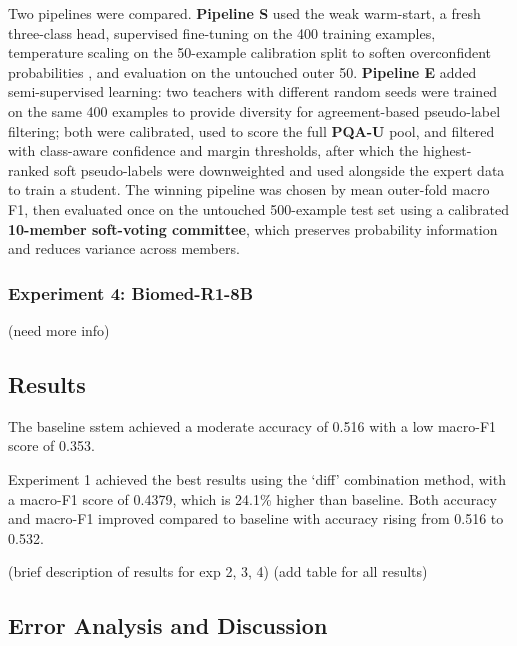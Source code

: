 \documentclass[11pt]{article}
\begin{document}
Two pipelines were compared. \textbf{Pipeline S} used the weak warm-start, a fresh three-class head, supervised fine-tuning on the 400 training examples, temperature scaling on the 50-example calibration split to soften overconfident probabilities \citep{guo_calibration_2017}, and evaluation on the untouched outer 50. \textbf{Pipeline E} added semi-supervised learning: two teachers with different random seeds were trained on the same 400 examples to provide diversity for agreement-based pseudo-label filtering; both were calibrated, used to score the full \textbf{PQA-U} pool, and filtered with class-aware confidence and margin thresholds, after which the highest-ranked soft pseudo-labels were downweighted and used alongside the expert data to train a student. The winning pipeline was chosen by mean outer-fold macro F1, then evaluated once on the untouched 500-example test set using a calibrated \textbf{10-member soft-voting committee}, which preserves probability information and reduces variance across members.

\subsubsection{Experiment 4: Biomed-R1-8B}
(need more info)

\subsection{Results}
The baseline sstem achieved a moderate accuracy of 0.516 with a low macro-F1 score of 0.353. \par
Experiment 1 achieved the best results using the ‘diff’ combination method, with a macro-F1 score of 0.4379, which is 24.1\% higher than baseline. Both accuracy and macro-F1 improved compared to baseline with accuracy rising from 0.516 to 0.532. \par
(brief description of results for exp 2, 3, 4)
(add table for all results)

\subsection{Error Analysis and Discussion}
\end{document}
